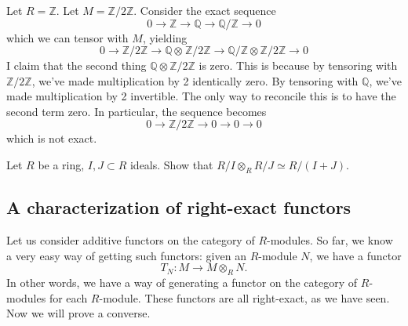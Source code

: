 \begin{example} \label{tensorbad}
Let $R = \mathbb{Z}$. Let $M = \mathbb{Z}/2\mathbb{Z}$. Consider the exact
sequence
\[ 0 \to \mathbb{Z} \to \mathbb{Q} \to \mathbb{Q}/\mathbb{Z} \to 0  \]
which we can tensor with $M$, yielding
\[ 0 \to \mathbb{Z}/2\mathbb{Z} \to \mathbb{Q} \otimes_{}
\mathbb{Z}/2\mathbb{Z} \to  \mathbb{Q}/\mathbb{Z} \otimes
\mathbb{Z}/2\mathbb{Z} \to 0  \]
I claim that the second thing $\mathbb{Q} \otimes \mathbb{Z}/2\mathbb{Z}$
is zero.  This is because by tensoring with
$\mathbb{Z}/2\mathbb{Z}$, we've made multiplication by 2 identically zero. By
tensoring with $\mathbb{Q}$, we've made multiplication by 2 invertible. The
only way to reconcile this is to have the second term zero. In particular, the
sequence becomes
\[ 0 \to \mathbb{Z}/2\mathbb{Z} \to 0 \to 0 \to 0  \]
which is not exact.
\end{example}

\begin{exercise}
Let $R$ be a ring, $I, J \subset R$ ideals. Show that $R/I \otimes_R R/J
\simeq R/(I+J)$.
\end{exercise}

\subsection{A characterization of right-exact functors}

Let us consider additive functors on the category of $R$-modules. So far,
we know a very easy way of getting such functors: given an $R$-module $N$, we
have a functor
\[ T_N: M \to M \otimes_R N.  \]
In other words, we have a way of generating a functor on the category of
$R$-modules for each $R$-module. These functors are all right-exact, as we
have seen.
Now we will prove a converse.

